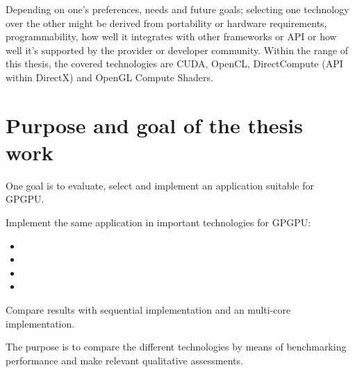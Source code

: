 Depending on one's preferences, needs and future goals; selecting one technology over the other might be derived from portability or hardware requirements, programmability, how well it integrates with other frameworks or \gls{API} or how well it's supported by the provider or developer community. Within the range of this thesis, the covered technologies are \gls{CUDA}, \gls{OpenCL}, DirectCompute (\gls{API} within DirectX) and \gls{OpenGL} Compute Shaders.

\section{Purpose and goal of the thesis work}
One goal is to evaluate, select and implement an application suitable for \gls{GPGPU}.

Implement the same application in important technologies for \gls{GPGPU}:
\begin{itemize}
	\item \CU
	\item \OCL
	\item \DX
	\item \GL
\end{itemize}
Compare results with sequential {\CPP} implementation and an multi-core {\OMP} implementation.

The purpose is to compare the different technologies by means of benchmarking performance and make relevant qualitative assessments.